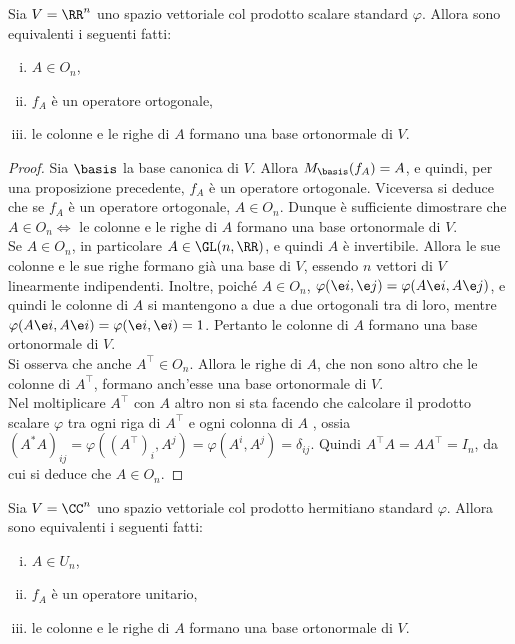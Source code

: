 \documentclass[11pt]{article}
\begin{document}
	\begin{proposition}
		Sia $V = \RR^n$ uno spazio vettoriale col prodotto scalare standard $\varphi$. Allora sono equivalenti i seguenti fatti:
		
		\begin{enumerate}[(i)]
			\item $A \in O_n$,
			\item $f_A$ è un operatore ortogonale,
			\item le colonne e le righe di $A$ formano una base ortonormale di $V$.
		\end{enumerate}
	\end{proposition}

	\begin{proof}
		Sia $\basis$ la base canonica di $V$. Allora $M_\basis(f_A) = A$, e quindi, per una proposizione
		precedente, $f_A$ è un operatore ortogonale. Viceversa si deduce che se $f_A$ è un operatore ortogonale,
		$A \in O_n$. Dunque è sufficiente dimostrare che $A \in O_n \iff$ le colonne e le righe di $A$ formano una
		base ortonormale di $V$. \\
		
		\rightproof Se $A \in O_n$, in particolare $A \in \GL(n, \RR)$, e quindi $A$ è invertibile. Allora le
		sue colonne e le sue righe formano già una base di $V$, essendo $n$ vettori di $V$ linearmente indipendenti.
		Inoltre, poiché $A \in O_n$, $\varphi(\e i, \e j) = \varphi(A \e i, A \e j)$, e quindi le colonne di $A$ si mantengono a due a due ortogonali tra di loro, mentre $\varphi(A \e i, A \e i) = \varphi(\e i, \e i) = 1$.
		Pertanto le colonne di $A$ formano una base ortonormale di $V$. \\

		Si osserva che anche $A^\top \in O_n$. Allora le righe di $A$, che non sono altro che
		le colonne di $A^\top$, formano anch'esse una base ortonormale di $V$. \\
		
		\leftproof Nel moltiplicare $A^\top$ con $A$ altro non si sta facendo che calcolare il prodotto
		scalare $\varphi$ tra ogni riga di $A^\top$ e ogni colonna di $A$	, ossia $(A^* A)_{ij} = \varphi((A^\top)_i, A^j) = \varphi(A^i, A^j) = \delta_{ij}$.
		Quindi $A^\top A = A A^\top = I_n$, da cui si deduce che $A \in O_n$.
	\end{proof}
	
	\begin{proposition}
		Sia $V = \CC^n$ uno spazio vettoriale col prodotto hermitiano standard $\varphi$. Allora sono equivalenti i seguenti fatti:
		
		\begin{enumerate}[(i)]
			\item $A \in U_n$,
			\item $f_A$ è un operatore unitario,
			\item le colonne e le righe di $A$ formano una base ortonormale di $V$.
		\end{enumerate}
	\end{proposition}
	
\end{document}
